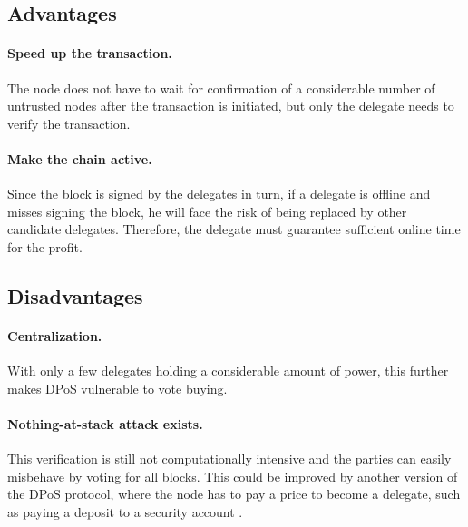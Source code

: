 \documentclass[lang=en]{sjtuarticle}
\begin{document}
\subsection{Advantages}

\paragraph{Speed up the transaction.} The node does not have to wait
for confirmation of a considerable number of untrusted
nodes after the transaction is initiated, but only the delegate
needs to verify the transaction.

\paragraph{Make the chain active.} Since the block is signed by the delegates in turn, if a delegate is offline and misses signing the
block, he will face the risk of being replaced by other
candidate delegates. Therefore, the delegate must guarantee sufficient online time for the profit.

\subsection{Disadvantages}

\paragraph{Centralization.} With only a few delegates holding a considerable amount of power, this further makes DPoS vulnerable to vote buying.

\paragraph{Nothing-at-stack attack exists.} This verification is still not computationally intensive
and the parties can easily misbehave by voting for all blocks. This could be improved by another version of the DPoS protocol, where the node has to pay
a price to become a delegate, such as paying a deposit to a
security account \cite{bitshare2}.


\end{document}
